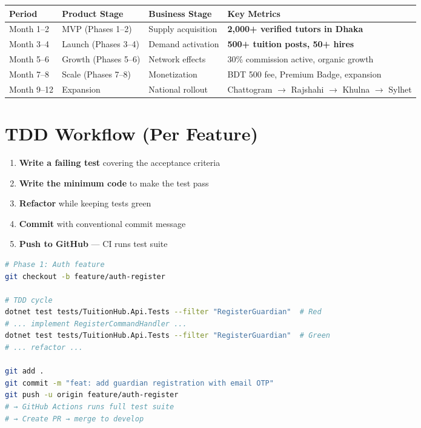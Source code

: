 \documentclass[12pt,a4paper,twoside]{report}
\begin{document}
\begin{longtable}{p{2cm}|p{3.5cm}|p{3cm}|p{4cm}}
\toprule
\textbf{Period} & \textbf{Product Stage} & \textbf{Business Stage} & \textbf{Key Metrics} \\
\midrule
\endhead
\bottomrule
\endfoot
Month 1--2 & MVP (Phases 1--2) & Supply acquisition & \textbf{2,000+ verified tutors in Dhaka} \\
Month 3--4 & Launch (Phases 3--4) & Demand activation & \textbf{500+ tuition posts, 50+ hires} \\
Month 5--6 & Growth (Phases 5--6) & Network effects & 30\% commission active, organic growth \\
Month 7--8 & Scale (Phases 7--8) & Monetization & BDT 500 fee, Premium Badge, expansion \\
Month 9--12 & Expansion & National rollout & Chattogram $\to$ Rajshahi $\to$ Khulna $\to$ Sylhet \\
\bottomrule
\end{longtable}

\section{TDD Workflow (Per Feature)}

\begin{enumerate}
    \item \textbf{Write a failing test} covering the acceptance criteria
    \item \textbf{Write the minimum code} to make the test pass
    \item \textbf{Refactor} while keeping tests green
    \item \textbf{Commit} with conventional commit message
    \item \textbf{Push to GitHub} --- CI runs test suite
\end{enumerate}

\begin{lstlisting}[style=code, language=bash, caption={Git Workflow Example}]
# Phase 1: Auth feature
git checkout -b feature/auth-register

# TDD cycle
dotnet test tests/TuitionHub.Api.Tests --filter "RegisterGuardian"  # Red
# ... implement RegisterCommandHandler ...
dotnet test tests/TuitionHub.Api.Tests --filter "RegisterGuardian"  # Green
# ... refactor ...

git add .
git commit -m "feat: add guardian registration with email OTP"
git push -u origin feature/auth-register
# → GitHub Actions runs full test suite
# → Create PR → merge to develop
\end{lstlisting}
\end{document}
